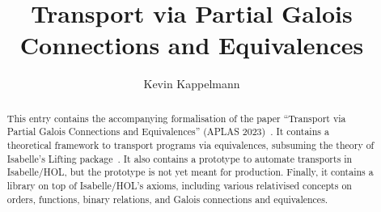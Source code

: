 \documentclass[11pt,a4paper]{report}
\begin{document}
\title{Transport via Partial Galois Connections and Equivalences}
\author{Kevin Kappelmann}
\maketitle

\begin{abstract}
This entry contains the accompanying formalisation of the paper
``Transport via Partial Galois Connections and Equivalences'' (APLAS 2023)~\cite{transport}.
It contains a theoretical framework to transport programs via equivalences,
subsuming the theory of Isabelle's Lifting package~\cite{lifting}.
It also contains a prototype to automate transports in Isabelle/HOL,
but the prototype is not yet meant for production.
Finally, it contains a library on top of Isabelle/HOL's axioms,
including various relativised concepts on orders, functions, binary relations,
and Galois connections and equivalences.
\end{abstract}

\tableofcontents





\end{document}
